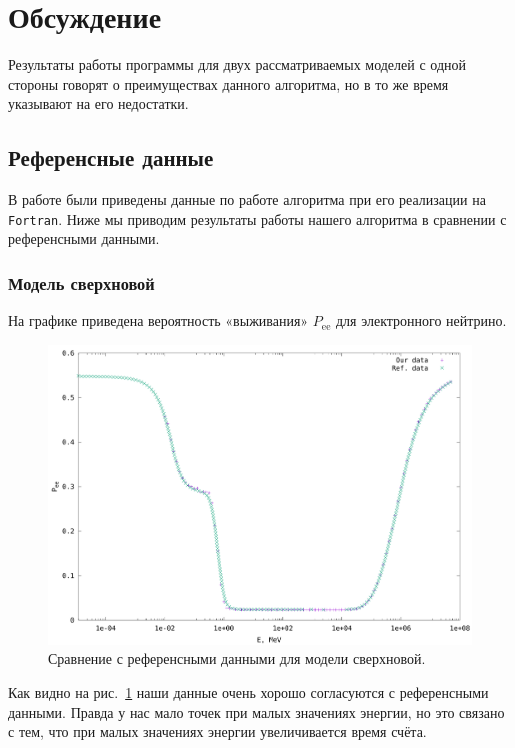 \documentclass[12pt]{article}
\begin{document}
\section{Обсуждение}

Результаты работы программы для двух рассматриваемых моделей с одной стороны
говорят о преимуществах данного алгоритма, но в то же время указывают на его
недостатки.

\subsection*{Референсные данные}

В работе \cite{casas2016} были приведены данные по работе алгоритма при его
реализации на
\verb|Fortran|. %
Ниже мы приводим результаты работы нашего алгоритма в сравнении с референсными
данными.

\subsubsection*{Модель сверхновой}

На графике приведена вероятность «выживания» \(P_{\text{ee}}\) для электронного
нейтрино.

\begin{figure}[htb]
  \hspace*{-2em}
  \includegraphics[scale=0.6]{sn_our_vs_ref}
  \caption{\label{fig:1}Сравнение с референсными данными для модели сверхновой.}
\end{figure}

Как видно на рис.~\ref{fig:1} наши данные очень хорошо согласуются с
референсными данными. Правда у нас мало точек при малых значениях энергии, но
это связано с тем, что при малых значениях энергии увеличивается время счёта.
\end{document}
